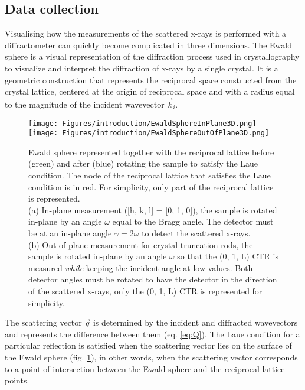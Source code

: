 \subsection{Data collection} \label{sec:DataCollectionSXRD}

Visualising how the measurements of the scattered x-rays is performed with a diffractometer can quickly become complicated in three dimensions.
The Ewald sphere is a visual representation of the diffraction process used in crystallography to visualize and interpret the diffraction of x-rays by a single crystal.
It is a geometric construction that represents the reciprocal space constructed from  the crystal lattice, centered at the origin of reciprocal space and with a radius equal to the magnitude of the incident wavevector $\vec{k}_i$.

\begin{figure}[!htb]
    \centering
    \texttt{[image: Figures/introduction/EwaldSphereInPlane3D.png]}
    \texttt{[image: Figures/introduction/EwaldSphereOutOfPlane3D.png]}
    \caption{
    Ewald sphere represented together with the reciprocal lattice before (green) and after (blue) rotating the sample to satisfy the Laue condition.
    The node of the reciprocal lattice that satisfies the Laue condition is in red.
    For simplicity, only part of the reciprocal lattice is represented.\\
    (a) In-plane measurement ([h, k, l] = [0, 1, 0]), the sample is rotated in-plane by an angle $\omega$ equal to the Bragg angle.
    The detector must be at an in-plane angle $\gamma=2\omega$ to detect the scattered x-rays.\\
    (b) Out-of-plane measurement for crystal truncation rods, the sample is rotated in-plane by an angle $\omega$ so that the (0, 1, L) CTR is measured \textit{while} keeping the incident angle at low values.
    Both detector angles must be rotated to have the detector in the direction of the scattered x-rays, only the (0, 1, L) CTR is represented for simplicity.
    }
    \label{fig:EwaldSphere}
\end{figure}

The scattering vector $\vec{q}$ is determined by the incident and diffracted wavevectors and represents the difference between them (eq. \ref{eq:Q}).
The Laue condition for a particular reflection is satisfied when the scattering vector lies on the surface of the Ewald sphere (fig. \ref{fig:EwaldSphere}), in other words, when the scattering vector corresponds to a point of intersection between the Ewald sphere and the reciprocal lattice points.

